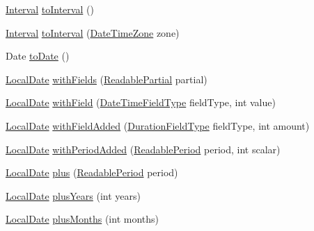 \begin{DoxyCompactItemize}
\item 
\hyperlink{classorg_1_1joda_1_1time_1_1_interval}{Interval} \hyperlink{classorg_1_1joda_1_1time_1_1_local_date_aa1a2a577d1c39a7c113550c6f56b15b5}{to\-Interval} ()
\item 
\hyperlink{classorg_1_1joda_1_1time_1_1_interval}{Interval} \hyperlink{classorg_1_1joda_1_1time_1_1_local_date_ae3115c0f7ee500f12f9e9573bf0f7464}{to\-Interval} (\hyperlink{classorg_1_1joda_1_1time_1_1_date_time_zone}{Date\-Time\-Zone} zone)
\item 
Date \hyperlink{classorg_1_1joda_1_1time_1_1_local_date_a949f4733680bcfe5550f3ed5f7f3346f}{to\-Date} ()
\item 
\hyperlink{classorg_1_1joda_1_1time_1_1_local_date}{Local\-Date} \hyperlink{classorg_1_1joda_1_1time_1_1_local_date_ab569e1e9720e9dfee189ca2e3414f35e}{with\-Fields} (\hyperlink{interfaceorg_1_1joda_1_1time_1_1_readable_partial}{Readable\-Partial} partial)
\item 
\hyperlink{classorg_1_1joda_1_1time_1_1_local_date}{Local\-Date} \hyperlink{classorg_1_1joda_1_1time_1_1_local_date_a4ef59313a238747efea32bec244d1829}{with\-Field} (\hyperlink{classorg_1_1joda_1_1time_1_1_date_time_field_type}{Date\-Time\-Field\-Type} field\-Type, int value)
\item 
\hyperlink{classorg_1_1joda_1_1time_1_1_local_date}{Local\-Date} \hyperlink{classorg_1_1joda_1_1time_1_1_local_date_adfb50fb69384c6fb20ab9e0a5dd9b8ea}{with\-Field\-Added} (\hyperlink{classorg_1_1joda_1_1time_1_1_duration_field_type}{Duration\-Field\-Type} field\-Type, int amount)
\item 
\hyperlink{classorg_1_1joda_1_1time_1_1_local_date}{Local\-Date} \hyperlink{classorg_1_1joda_1_1time_1_1_local_date_a7080e8b0bcfc43cc9b412360cb684b09}{with\-Period\-Added} (\hyperlink{interfaceorg_1_1joda_1_1time_1_1_readable_period}{Readable\-Period} period, int scalar)
\item 
\hyperlink{classorg_1_1joda_1_1time_1_1_local_date}{Local\-Date} \hyperlink{classorg_1_1joda_1_1time_1_1_local_date_afd080a3bb7e771fe7083bba333a325e7}{plus} (\hyperlink{interfaceorg_1_1joda_1_1time_1_1_readable_period}{Readable\-Period} period)
\item 
\hyperlink{classorg_1_1joda_1_1time_1_1_local_date}{Local\-Date} \hyperlink{classorg_1_1joda_1_1time_1_1_local_date_ad1a0864a1d91e10dfb10fe568f5b40bd}{plus\-Years} (int years)
\item 
\hyperlink{classorg_1_1joda_1_1time_1_1_local_date}{Local\-Date} \hyperlink{classorg_1_1joda_1_1time_1_1_local_date_ad9cfd078ed396f5d14b15211d6578629}{plus\-Months} (int months)

\end{DoxyCompactItemize}
